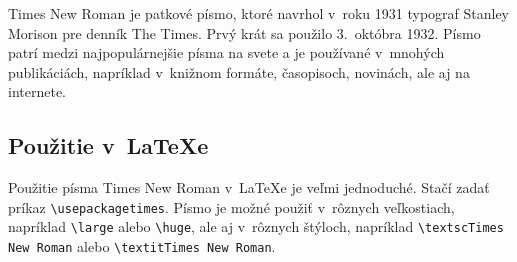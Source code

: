 \documentclass[a4paper, 11pt, hyphens]{article}
\begin{document}
Times New Roman je patkové písmo, ktoré navrhol v~roku 1931 typograf Stanley Morison pre denník The Times. Prvý krát sa použilo 3.\ októbra 1932\cite{NYLib}.
Písmo patrí medzi najpopulárnejšie písma na svete a je používané v~mnohých publikáciách, napríklad v~knižnom formáte, časopisoch, novinách, ale aj na internete\cite{TimesWiki}.

\subsection*{Použitie v~LaTeXe}

Použitie písma Times New Roman v~LaTeXe je veľmi jednoduché. Stačí zadať príkaz \texttt{\textbackslash usepackage{times}}.
Písmo je možné použiť v~rôznych veľkostiach, napríklad \texttt{\textbackslash large} alebo \texttt{\textbackslash huge}, ale aj v~rôznych štýloch, napríklad \texttt{\textbackslash textsc{Times New Roman}} alebo \texttt{\textbackslash textit{Times New Roman}}\cite{Rybicka2003}.

\newpage

\renewcommand{\refname}{Literatura}

\end{document}
